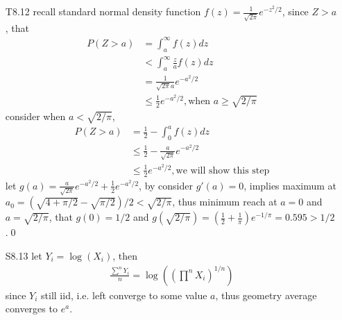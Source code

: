 \documentclass[paper=a4, fontsize=11pt]{scrartcl} %
\numberwithin{equation}{section} %
\numberwithin{figure}{section} %
\numberwithin{table}{section} %
\begin{document}
\begin{itemize}
	\item[T8.12] recall standard normal density function $f(z)= \frac{1}{\sqrt{2\pi}} e^{-z^2/2} $, since $Z>a$, that
	\begin{align}
		P(Z>a) &= \int_a^\infty f(z)dz \\
			&< \int_a^\infty \frac{z}{a} f(z)dz \\
			&= \frac{1}{\sqrt{2\pi} a} e^{-a^2/2}\\
			&\leq \frac{1}{2}e^{-a^2/2}, \text{when } a\geq\sqrt{2/\pi}
	\end{align}
	consider when $a < \sqrt{2/\pi}$,
	\begin{align}
		P(Z>a) &= \frac{1}{2} - \int_0^a f(z)dz \\
			&\leq \frac{1}{2} - \frac{a}{\sqrt{2\pi}} e^{-a^2/2}\\
			&\leq \frac{1}{2}e^{-a^2/2}, \text{we will show this step}
	\end{align}
	let $g(a)= \frac{a}{\sqrt{2\pi}} e^{-a^2/2}+ \frac{1}{2}e^{-a^2/2}$, by consider $g'(a)=0$, implies maximum at $a_0=(\sqrt{4+\pi/2} -\sqrt{\pi/2})/2< \sqrt{2/\pi}$, thus minimum reach at $a=0$ and $a=\sqrt{2/\pi}$, that $g(0)=1/2$ and $g(\sqrt{2/\pi})=(\frac{1}{2}+\frac{1}{\pi})e^{-1/\pi}=0.595>1/2$.\qed
	\item[S8.13] let $Y_i = \log (X_i)$, then 
	\begin{align}
		\frac{\sum^n Y_i}{n} = \log((\prod^n X_i)^{1/n})
	\end{align}
	since $Y_i$ still iid, i.e. left converge to some value $a$, thus geometry average converges to $e^a$.
\end{itemize}
\end{document}
